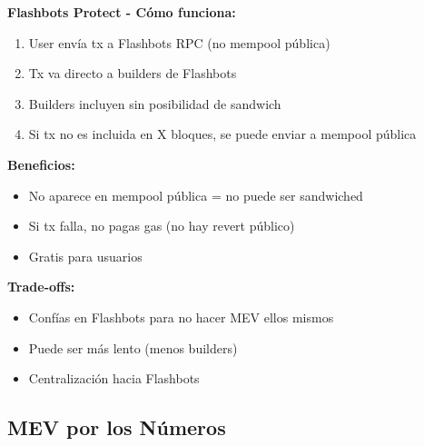 \documentclass[11pt,a4paper,twoside,openright]{book}
\theoremstyle{definition}
\theoremstyle{plain}
\theoremstyle{remark}
\begin{document}
\begin{keyidea}
\textbf{Flashbots Protect - Cómo funciona:}

\begin{enumerate}
    \item User envía tx a Flashbots RPC (no mempool pública)
    \item Tx va directo a builders de Flashbots
    \item Builders incluyen sin posibilidad de sandwich
    \item Si tx no es incluida en X bloques, se puede enviar a mempool pública
\end{enumerate}

\textbf{Beneficios:}
\begin{itemize}
    \item No aparece en mempool pública = no puede ser sandwiched
    \item Si tx falla, no pagas gas (no hay revert público)
    \item Gratis para usuarios
\end{itemize}

\textbf{Trade-offs:}
\begin{itemize}
    \item Confías en Flashbots para no hacer MEV ellos mismos
    \item Puede ser más lento (menos builders)
    \item Centralización hacia Flashbots
\end{itemize}
\end{keyidea}

\subsection{MEV por los Números}
\end{document}
